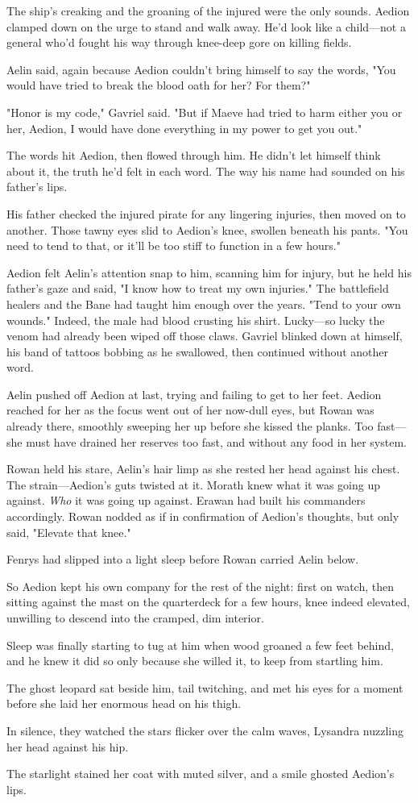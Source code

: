 The ship's creaking and the groaning of the injured were the only sounds.
Aedion clamped down on the urge to stand and walk away.
He'd look like a child---not a general who'd fought his way through knee-deep gore on killing fields.

Aelin said, again because Aedion couldn't bring himself to say the words, "You would have tried to break the blood oath for her?
For them?"

"Honor is my code," Gavriel said.
"But if Maeve had tried to harm either you or her, Aedion, I would have done everything in my power to get you out."

The words hit Aedion, then flowed through him.
He didn't let himself think about it, the truth he'd felt in each word.
The way his name had sounded on his father's lips.

His father checked the injured pirate for any lingering injuries, then moved on to another.
Those tawny eyes slid to Aedion's knee, swollen beneath his pants.
"You need to tend to that, or it'll be too stiff to function in a few hours."

Aedion felt Aelin's attention snap to him, scanning him for injury, but he held his father's gaze and said, "I know how to treat my own injuries."
The battlefield healers and the Bane had taught him enough over the years.
"Tend to your own wounds."
Indeed, the male had blood crusting his shirt.
Lucky---so lucky the venom had already been wiped off those claws.
Gavriel blinked down at himself, his band of tattoos bobbing as he swallowed, then continued without another word.

Aelin pushed off Aedion at last, trying and failing to get to her feet.
Aedion reached for her as the focus went out of her now-dull eyes, but Rowan was already there, smoothly sweeping her up before she kissed the planks.
Too fast--- she must have drained her reserves too fast, and without any food in her system.

Rowan held his stare, Aelin's hair limp as she rested her head against his chest.
The strain---Aedion's guts twisted at it.
Morath knew what it was going up against.
\emph{Who} it was going up against.
Erawan had built his commanders accordingly.
Rowan nodded as if in confirmation of Aedion's thoughts, but only said, "Elevate that knee."

Fenrys had slipped into a light sleep before Rowan carried Aelin below.

So Aedion kept his own company for the rest of the night: first on watch, then sitting against the mast on the quarterdeck for a few hours, knee indeed elevated, unwilling to descend into the cramped, dim interior.

Sleep was finally starting to tug at him when wood groaned a few feet behind, and he knew it did so only because she willed it, to keep from startling him.

The ghost leopard sat beside him, tail twitching, and met his eyes for a moment before she laid her enormous head on his thigh.

In silence, they watched the stars flicker over the calm waves, Lysandra nuzzling her head against his hip.

The starlight stained her coat with muted silver, and a smile ghosted Aedion's lips.
